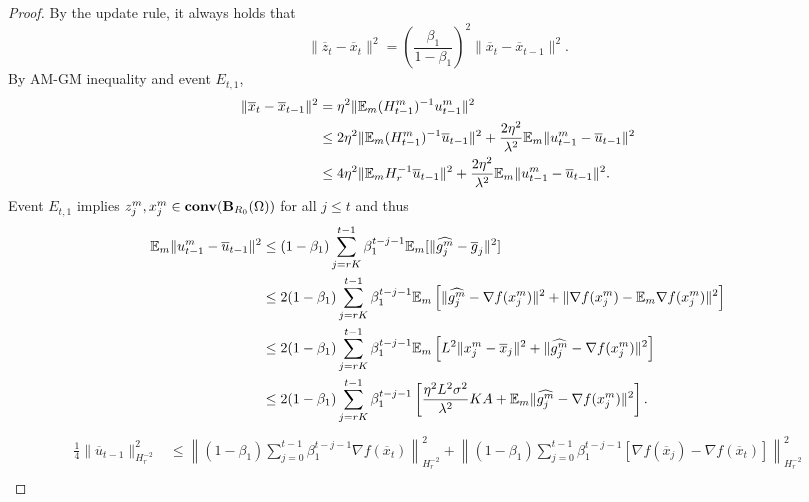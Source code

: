 \documentclass{article} %
\numberwithin{equation}{section}
\begin{document}
\begin{proof}
    By the update rule, it always holds that
    \begin{equation}\label{eq:7}
        \|\overline{z}_t-\overline{x}_t\|^2 = (\frac{\beta_1}{1-\beta_1})^2 \|\overline{x}_t-\overline{x}_{t-1}\|^2.
    \end{equation}
    By AM-GM inequality and event $E_{t,1}$,
    \begin{equation}
        \begin{aligned}
            \|\overline{x}_t-\overline{x}_{t-1}\|^2
            &= \eta^2\|\mathbb{E}_m (H_{t-1}^m)^{-1}u_{t-1}^m \|^2 \\
            &\leq 2\eta^2\|\mathbb{E}_m (H_{t-1}^m)^{-1}\overline{u}_{t-1} \|^2 + \frac{2\eta^2}{\lambda^2} \mathbb{E}_m\|u_{t-1}^m-\overline{u}_{t-1}\|^2 \\
            &\leq 4\eta^2\|\mathbb{E}_m H_r^{-1}\overline{u}_{t-1} \|^2 + \frac{2\eta^2}{\lambda^2} \mathbb{E}_m\|u_{t-1}^m-\overline{u}_{t-1}\|^2.
        \end{aligned}
    \end{equation}
    Event $E_{t,1}$ implies $z_j^m, x_j^m\in \mbox{\bf conv}(\mbox{\bf B}_{R_0}(\Omega))$ for all $j\leq t$ and thus 
    \begin{equation}
        \begin{aligned}
            \mathbb{E}_m\|u_{t-1}^m-\overline{u}_{t-1}\|^2
            &\leq (1-\beta_1)\sum_{j=rK}^{t-1}\beta_1^{t-j-1}\mathbb{E}_m[\|\widehat{g_j^m}-\overline{g}_j\|^2] \\
            &\leq 2(1-\beta_1)\sum_{j=rK}^{t-1}\beta_1^{t-j-1}\mathbb{E}_m\left[\|\widehat{g_j^m}-\nabla f(x_j^m)\|^2+\|\nabla f(x_j^m)-\mathbb{E}_m\nabla f(x_j^m)\|^2\right] \\
            &\leq 2(1-\beta_1)\sum_{j=rK}^{t-1}\beta_1^{t-j-1}\mathbb{E}_{m}\left[L^2\| x_j^m-\overline{x}_j\|^2+\|\widehat{g_j^m}-\nabla f(x_j^m)\|^2\right] \\
            &\leq 2(1-\beta_1)\sum_{j=rK}^{t-1}\beta_1^{t-j-1} \left[\frac{\eta^2L^2\sigma^2}{\lambda^2}KA+\mathbb{E}_m\|\widehat{g_j^m}-\nabla f(x_j^m)\|^2\right].
        \end{aligned}
    \end{equation}
    \begin{equation}
        \begin{aligned}
            \frac{1}{4}\|\overline{u}_{t-1} \|_{H_r^{-2}}^2
            &\leq \left\|(1-\beta_1)\sum_{j=0}^{t-1}\beta_1^{t-j-1} \nabla f(\overline{x}_t)\right\|_{H_r^{-2}}^2 + \left\|(1-\beta_1)\sum_{j=0}^{t-1}\beta_1^{t-j-1} [\nabla f(\overline{x}_j) - \nabla f(\overline{x}_t)] \right\|_{H_r^{-2}}^2  \\

\end{aligned}
\end{equation}
\end{proof}
\end{document}
